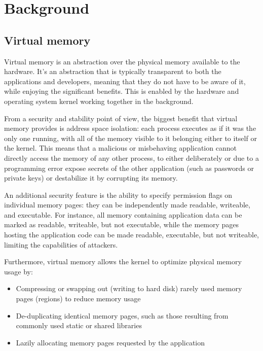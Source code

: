 \chapter{Background}
\label{ch:background}


\section{Virtual memory}

Virtual memory is an abstraction over the physical memory available to the hardware. It's an abstraction that is typically transparent to both the applications and developers, meaning that they do not have to be aware of it, while enjoying the significant benefits. This is enabled by the hardware and operating system kernel working together in the background.

From a security and stability point of view, the biggest benefit that virtual memory provides is address space isolation: each process executes as if it was the only one running, with all of the memory visible to it belonging either to itself or the kernel. This means that a malicious or misbehaving application cannot directly access the memory of any other process, to either deliberately or due to a programming error expose secrets of the other application (such as passwords or private keys) or destabilize it by corrupting its memory.

An additional security feature is the ability to specify permission flags on individual memory pages: they can be independently made readable, writeable, and executable. For instance, all memory containing application data can be marked as readable, writeable, but not executable, while the memory pages hosting the application code can be made readable, executable, but not writeable, limiting the capabilities of attackers.

Furthermore, virtual memory allows the kernel to optimize physical memory usage by:

\begin{itemize}
	\item Compressing or swapping out (writing to hard disk) rarely used memory pages (regions) to reduce memory usage
	\item De-duplicating identical memory pages, such as those resulting from commonly used static or shared libraries
	\item Lazily allocating memory pages requested by the application
\end{itemize}

